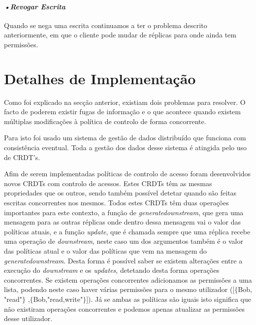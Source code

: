 \documentclass[runningheads,a4paper]{llncs}
\begin{document}
\paragraph{\textbf{\textit{•Revogar Escrita}}}

Quando se nega uma escrita continuamos a ter o problema descrito anteriormente, em que o cliente pode mudar de réplicas para onde ainda tem permissões.


\section{Detalhes de Implementação}\label{sec:implementacao}

Como foi explicado na secção anterior, existiam dois problemas para resolver. O facto de poderem existir fugas de informação e o que acontece quando existem múltiplas modificações à política de controlo de forma concorrente.

Para isto foi usado um sistema de gestão de dados distribuído que funciona com consistência eventual. Toda a gestão dos dados desse sistema é atingida pelo uso de CRDT's.

Afim de serem implementadas políticas de controlo de acesso foram desenvolvidos novos CRDTs com controlo de acessos. Estes CRDTs têm as mesmas propriedades que os outros, sendo também possível detetar quando são feitas escritas concorrentes nos mesmos. Todos estes CRDTs têm duas operações importantes para este contexto, a função de \textit{generatedownstream}, que gera uma mensagem para as outras réplicas onde dentro dessa mensagem vai o valor das políticas atuais, e a função \textit{update}, que é chamada sempre que uma réplica recebe uma operação de \textit{downstream}, neste caso um dos argumentos também é o valor das políticas atual e o valor das políticas que vem na mensagem do \textit{generatedownstream}. Desta forma é possível saber se existem alterações entre a execução do \textit{downstream} e os \textit{updates}, detetando desta forma operações concorrentes. 
Se existem operações concorrentes adicionamos as permissões a uma lista, podendo neste caso haver várias permissões para o mesmo utilizador ([$\lbrace$Bob, "read"$\rbrace$ ,$\lbrace$Bob,"read,write"$\rbrace$]). Já se ambas as políticas são iguais isto significa que não existiram operações concorrentes e podemos apenas atualizar as permissões desse utilizador.
\end{document}
